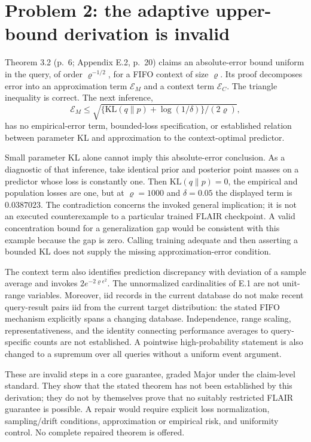 \documentclass[10pt]{article}
\begin{document}
\section*{Problem 2: the adaptive upper-bound derivation is invalid}
Theorem 3.2 (p. 6; Appendix E.2, p. 20) claims an absolute-error bound uniform in the query, of order \(\varrho^{-1/2}\), for a FIFO context of size \(\varrho\). Its proof decomposes error into an approximation term \(\mathcal E_M\) and a context term \(\mathcal E_C\). The triangle inequality is correct. The next inference, \[\mathcal E_M\le\sqrt{\{\mathrm{KL}(q\|p)+\log(1/\delta)\}/(2\varrho)},\] has no empirical-error term, bounded-loss specification, or established relation between parameter KL and approximation to the context-optimal predictor.\par
Small parameter KL alone cannot imply this absolute-error conclusion. As a diagnostic of that inference, take identical prior and posterior point masses on a predictor whose loss is constantly one. Then \(\mathrm{KL}(q\|p)=0\), the empirical and population losses are one, but at \(\varrho=1000\) and \(\delta=0.05\) the displayed term is \(0.0387023\). The contradiction concerns the invoked general implication; it is not an executed counterexample to a particular trained FLAIR checkpoint. A valid concentration bound for a generalization gap would be consistent with this example because the gap is zero. Calling training adequate and then asserting a bounded KL does not supply the missing approximation-error condition.\par
The context term also identifies prediction discrepancy with deviation of a sample average and invokes \(2e^{-2\varrho\epsilon^2}\). The unnormalized cardinalities of E.1 are not unit-range variables. Moreover, iid records in the current database do not make recent query-result pairs iid from the current target distribution: the stated FIFO mechanism explicitly spans a changing database. Independence, range scaling, representativeness, and the identity connecting performance averages to query-specific counts are not established. A pointwise high-probability statement is also changed to a supremum over all queries without a uniform event argument.\par
These are invalid steps in a core guarantee, graded Major under the claim-level standard. They show that the stated theorem has not been established by this derivation; they do not by themselves prove that no suitably restricted FLAIR guarantee is possible. A repair would require explicit loss normalization, sampling/drift conditions, approximation or empirical risk, and uniformity control. No complete repaired theorem is offered.\par
\end{document}
